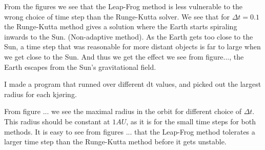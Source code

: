 \documentclass[a4paper,12pt, english]{article}
\begin{document}
From the figures we see that the Leap-Frog method is less vulnerable to the wrong choice of time step than the Runge-Kutta solver. We see that for $\Delta t = 0.1$ the Runge-Kutta method gives a solution where the Earth starts spiraling inwards to the Sun. (Non-adaptive method). As the Earth gets too close to the Sun, a time step that was reasonable for more distant objects is far to large when we get close to the Sun. And thus we get the effect we see from figure..., the Earth escapes from the Sun's  gravitational field. 

I made a program that runned over different dt values, and picked out the largest radius for each kjøring. 

From figure ... we see the maximal radius in the orbit for different choice of $\Delta t$. 
This radius should be constant at $1 AU$, as it is for the small time steps for both methods. It is easy to see from figures ... that the Leap-Frog method tolerates a larger time step than the Runge-Kutta method before it gets unstable. 
\end{document}
